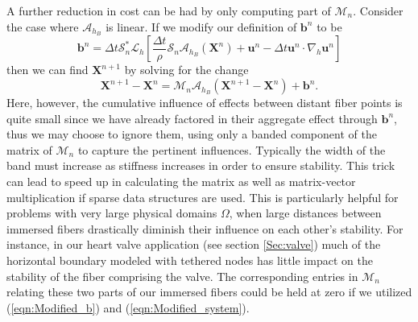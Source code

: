 \documentclass[preprint,12pt]{elsarticle}
\begin{document}
A further reduction in cost can be had by only computing part of $\mathcal{M}_n$. Consider the case where $\mathcal{A}_{h_B}$ is linear. If we modify our definition of $\mathbf{b}^n$ to be
\begin{equation}
\mathbf{b}^n=\Delta t\mathcal{S}^*_n\mathcal{L}_h
\left[\frac{\Delta t}{\rho} \mathcal{S}_n\mathcal{A}_{h_B}(\mathbf{X}^n) + \mathbf{u}^n - \Delta t\mathbf{u}^n \cdot \nabla_h \mathbf{u}^n \right]
\label{eqn:Modified_b}
\end{equation}
then we can find $\mathbf{X}^{n+1}$ by solving for the change
\begin{equation}
\mathbf{X}^{n+1}-\mathbf{X}^n = \mathcal{M}_n \mathcal{A}_{h_B} (\mathbf{X}^{n+1}-\mathbf{X}^n) + \mathbf{b}^n.
\label{eqn:Modified_system}
\end{equation}
Here, however, the cumulative influence of effects between distant fiber points is quite small since we have already factored in their aggregate effect through $\mathbf{b}^n$, thus we may choose to ignore them, using only a banded component of the matrix of $\mathcal{M}_n$ to capture the pertinent influences. Typically the width of the band must increase as stiffness increases in order to ensure stability. This trick can lead to speed up in calculating the matrix as well as matrix-vector multiplication if sparse data structures are used. This is particularly helpful for problems with very large physical domains $\Omega$, when large distances between immersed fibers drastically diminish their influence on each other's stability. For instance, in our heart valve application (see section \ref{Sec:valve}) much of the horizontal boundary modeled with tethered nodes has little impact on the stability of the fiber comprising the valve. The corresponding entries in $\mathcal{M}_n$ relating these two parts of our immersed fibers could be held at zero if we utilized (\ref{eqn:Modified_b}) and (\ref{eqn:Modified_system}).
\end{document}
